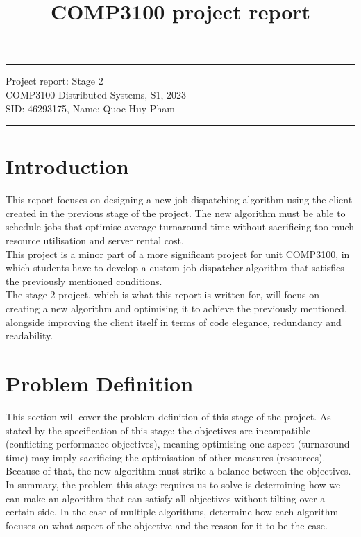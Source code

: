 \documentclass[a4paper]{article} %
\begin{document}

\title{COMP3100 project report} %
\fancyhead[C]{}
\hrule \medskip %
\begin{minipage}{1\textwidth} %
\centering 
\large %
Project report: Stage 2\\ %
COMP3100 Distributed Systems, S1, 2023\\
\normalsize %
SID: 46293175, Name: Quoc Huy Pham
\end{minipage}
\medskip\hrule %
\bigskip

\section{Introduction}

This report focuses on designing a new job dispatching algorithm using the client created in the previous stage of the project. The new algorithm must be able to schedule jobs that optimise
average turnaround time without sacrificing too much resource utilisation and server rental cost.
\\This project is a minor part of a more significant project for unit COMP3100, in which students have to develop a custom job dispatcher algorithm that satisfies the previously mentioned conditions.
\\The stage 2 project, which is what this report is written for, will focus on creating a new algorithm and optimising it to achieve the previously mentioned, alongside improving the client itself in terms of code elegance, redundancy and readability.

\section{Problem Definition}
\label{sec:section2}

This section will cover the problem definition of this stage of the project. As stated by the specification of this stage: the objectives are incompatible (conflicting performance objectives), meaning optimising one aspect (turnaround time) may imply sacrificing the optimisation of other measures (resources). Because of that, the new algorithm must strike a balance between the objectives.\\
In summary, the problem this stage requires us to solve is determining how we can make an algorithm that can satisfy all objectives without tilting over a certain side. In the case of multiple algorithms, determine how each algorithm focuses on what aspect of the objective and the reason for it to be the case.
\end{document}

